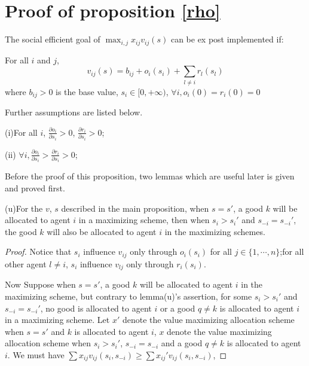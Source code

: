 
\chapter{Proof of proposition \ref{rho}} %

\label{Appendix_B} %
\begin{prop*}
  The social efficient goal of $\max_{i,j}x_{ij}v_{ij}(s)$ can be ex post implemented if:
  
For all $i$ and $j$,
$$v_{ij}(s)=b_{ij} + o_i(s_i) + \sum_{l \not = i} r_l(s_l) $$
where $b_{ij}>0$ is the base value, $s_i \in [0, + \infty)$, $\forall i,o_i(0)=r_i(0)=0$

Further assumptions are listed below.

(i)For all $i$, $\frac{\partial o_i}{\partial s_i} > 0$, $\frac{\partial r_i}{\partial s_i} > 0$;

(ii) $\forall i, \frac{\partial o_i}{\partial s_i}
> \frac{\partial r_i}{\partial s_i} > 0$;

\end{prop*}

Before the proof of this proposition,  two lemmas which are useful later is given and proved first.
\begin{lemma*}
  (u)For the $v$, $s$ described in the main proposition, when $s= s'$, a good $k$ will be allocated to agent $i$ in a maximizing scheme, then when $s_i > s_i'$ and $s_{-i}=s_{-i}'$, the good $k$ will also be allocated to agent $i$ in the maximizing schemes. 
\end{lemma*}
\begin{proof}
  Notice that $s_i$ influence $v_{ij}$ only through $o_i(s_i)$ for all $j \in \{1,\cdots,n\}$;for all other agent $l \not = i$, $s_i$ influence $v_{lj}$ only through $r_i(s_i)$.

  Now Suppose when $s= s'$, a good $k$ will be allocated to agent $i$ in the maximizing scheme, but contrary to lemma(u)'s assertion, for some $s_i > s_i'$ and $s_{-i}=s_{-i}'$,  no good is allocated to agent $i$ or a good $q \not= k$ is allocated to agent $i$ in a maximizing scheme. Let $x'$ denote the value maximizing allocation scheme when $s=s'$ and $k$ is allocated to agent $i$, $x$ denote the value maximizing allocation scheme when $s_i>s_i'$, $s_{-i}=s_{-i}$ and a good $q \not= k$ is allocated to agent $i$. We must have $\sum x_{ij}v_{ij}(s_i,s_{-i}) \geq \sum x_{ij}'v_{ij}(s_i,s_{-i})$,  
\end{proof}

